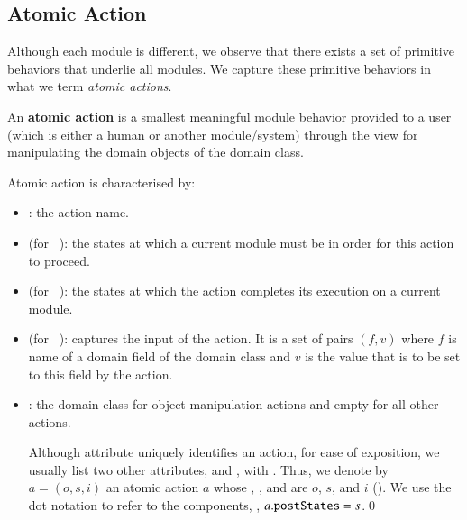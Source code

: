 \subsection{Atomic Action} \label{sect:arch-atomic-action}
Although each module is different, we observe that there exists a set of primitive behaviors that underlie all modules. We capture these primitive behaviors in what we term \textit{atomic actions}.
%
\begin{definition} \label{def:atomic-action}
An \textbf{atomic action} is a smallest meaningful module behavior provided to a user (which is either a human or another module/system) through the view for manipulating the domain objects of the domain class.

%
Atomic action is characterised by: 
\begin{itemize}
\item {}: the action name.
%
\item {} (for ~\cite{omg_unified_2015}): the states at which a current module must be in order for this action to proceed.
%
\item {} (for ~\cite{omg_unified_2015}): the states at which the action completes its execution on a current module.
%
\item {} (for ~\cite{omg_unified_2015}): captures the input of the action. It is a set of pairs $(f,v)$ where $f$ is name of a domain field of the domain class and $v$ is the value that is to be set to this field by the action. 
%
\item {}: the domain class for object manipulation actions and empty for all other actions.

Although attribute  uniquely identifies an action, for ease of exposition, we usually list two other attributes,  and , with .
%
Thus, we denote by $ a = (o,s,i) $ an atomic action $a$ whose , , and  are $ o $, $ s $, and $i$ (\resp). We use the dot notation to refer to the components, \eg, $ a.{\tt postStates} = s$.\qed
\end{itemize}
\end{definition}

